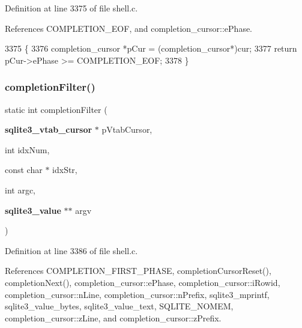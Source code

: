 Definition at line 3375 of file shell.\+c.



References C\+O\+M\+P\+L\+E\+T\+I\+O\+N\+\_\+\+E\+OF, and completion\+\_\+cursor\+::e\+Phase.


\begin{DoxyCode}
3375                                                   \{
3376   completion_cursor *pCur = (completion_cursor*)cur;
3377   \textcolor{keywordflow}{return} pCur->ePhase >= COMPLETION_EOF;
3378 \}
\end{DoxyCode}
\mbox{\label{shell_8c_a29c92da3a9d606eb6796d07f79f364bb}} 
\subsubsection{completion\+Filter()}
{\footnotesize\ttfamily static int completion\+Filter (\begin{DoxyParamCaption}\item[{\textbf{ sqlite3\+\_\+vtab\+\_\+cursor} $\ast$}]{p\+Vtab\+Cursor,  }\item[{int}]{idx\+Num,  }\item[{const char $\ast$}]{idx\+Str,  }\item[{int}]{argc,  }\item[{\textbf{ sqlite3\+\_\+value} $\ast$$\ast$}]{argv }\end{DoxyParamCaption})\hspace{0.3cm}{\ttfamily [static]}}



Definition at line 3386 of file shell.\+c.



References C\+O\+M\+P\+L\+E\+T\+I\+O\+N\+\_\+\+F\+I\+R\+S\+T\+\_\+\+P\+H\+A\+SE, completion\+Cursor\+Reset(), completion\+Next(), completion\+\_\+cursor\+::e\+Phase, completion\+\_\+cursor\+::i\+Rowid, completion\+\_\+cursor\+::n\+Line, completion\+\_\+cursor\+::n\+Prefix, sqlite3\+\_\+mprintf, sqlite3\+\_\+value\+\_\+bytes, sqlite3\+\_\+value\+\_\+text, S\+Q\+L\+I\+T\+E\+\_\+\+N\+O\+M\+EM, completion\+\_\+cursor\+::z\+Line, and completion\+\_\+cursor\+::z\+Prefix.


